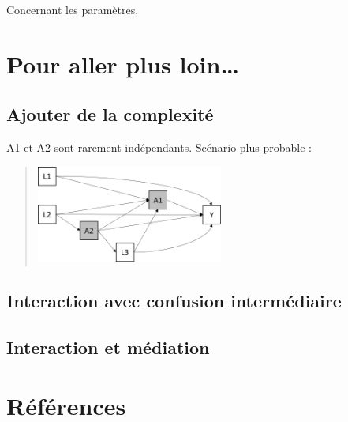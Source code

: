 \documentclass[
]{book}
\begin{document}
Concernant les paramètres,

\hypertarget{plusloin}{%
\chapter{Pour aller plus loin\ldots{}}\label{plusloin}}

\hypertarget{ajouter-de-la-complexituxe9}{%
\section{Ajouter de la complexité}\label{ajouter-de-la-complexituxe9}}

A1 et A2 sont rarement indépendants. Scénario plus probable :

\begin{quote}
\includegraphics[width=0.5\textwidth,height=\textheight]{img/Image11.png}
\end{quote}

\hypertarget{interaction-avec-confusion-intermuxe9diaire}{%
\section{Interaction avec confusion intermédiaire}\label{interaction-avec-confusion-intermuxe9diaire}}

\hypertarget{interaction-et-muxe9diation}{%
\section{Interaction et médiation}\label{interaction-et-muxe9diation}}

\citet{vanderweele_three-way_2013}

\citet{vanderweele_unification_2014}

\hypertarget{ruxe9fuxe9rences}{%
\chapter{Références}\label{ruxe9fuxe9rences}}

  
\end{document}
